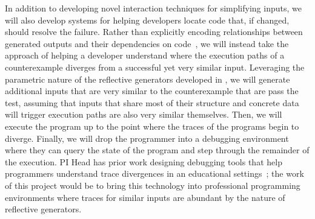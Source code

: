 

In addition to developing novel interaction techniques for simplifying inputs,
we will also develop systems for helping developers locate code that, if
changed, should resolve the failure. Rather than explicitly encoding
relationships between generated outputs and their dependencies on
code~\cite{ref:ko2009finding}, we will instead take the approach of helping a
developer understand where the execution paths of a counterexample diverges from
a successful yet very similar input. Leveraging the parametric nature of the
reflective generators developed in , we will generate
additional inputs that are very similar to the counterexample that are pass the
test, assuming that inputs that share most of their structure and concrete data
will trigger execution paths are also very similar themselves. Then, we will
execute the program up to the point where the traces of the programs begin to
diverge. Finally, we will drop the programmer into a debugging environment where
they can query the state of the program and step through the remainder of the
execution. PI Head has prior work designing debugging tools that help
programmers understand trace divergences in an educational
settings~\cite{ref:suzuki2017tracediff}; the work of this project would be to
bring this technology into professional programming environments where traces
for similar inputs are abundant by the nature of reflective generators.

